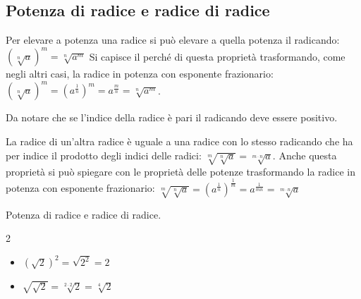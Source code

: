 \subsection{Potenza di radice e radice di radice}

Per elevare a potenza una radice si può elevare a quella potenza il 
radicando: \(\left(\sqrt[n]a\right)^m=\sqrt[n]{a^m}\)
Si capisce il perché di questa proprietà trasformando, come negli altri 
casi, la radice in potenza con esponente frazionario:
\(\left(\sqrt[n]a\right)^m=\left(a^{\frac 1 n}\right)^m=a^{\frac m n}=
\sqrt[n]{a^m}\).
\begin{osservazione}{}{}
Da notare che se l'indice della radice è pari il radicando deve essere 
positivo.
\end{osservazione}


La radice di un'altra radice è uguale a una radice con lo stesso 
radicando che ha per indice il prodotto degli indici delle radici: 
\(\sqrt[m]{\sqrt[n]a}=\sqrt[m\cdot n]a\). 
Anche questa proprietà si può spiegare con le proprietà delle potenze 
trasformando la radice in potenza con esponente frazionario: 
\(\sqrt[m]{\sqrt[n]a}=\left(a^{\frac 1 n}\right)^{\frac 1 m}=
a^{\frac 1{mn}}=\sqrt[m\cdot n]a\)

\vspace{-.5em}
% 
\begin{esempio}{}{}
Potenza di radice e radice di radice.
\begin{htmulticols}{2}
\begin{itemize}
\item \(\left(\sqrt{2}\right)^2=\sqrt{2^2}=2\)
\item \(\sqrt{\sqrt{2}}=\sqrt[2\cdot 2]2=\sqrt[4]2\)
\end{itemize}
\end{htmulticols}
\end{esempio}

